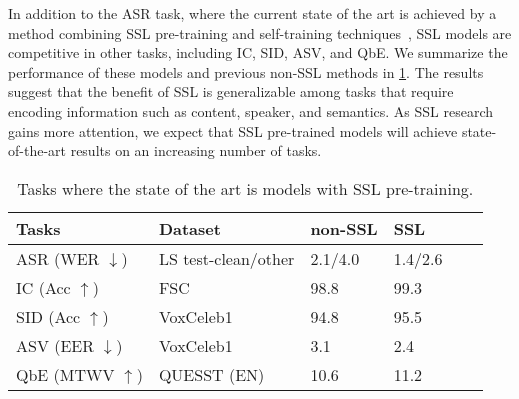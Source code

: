 In addition to the ASR task, where the current state of the art is achieved by a method
combining SSL pre-training and self-training 
techniques~\parencite{zhang_pushing_2020}, SSL models are competitive in other tasks, including IC,
SID, ASV, and QbE. We summarize the performance of these models and previous
non-SSL methods in \cref{table:sota_performance}. The results suggest that the
benefit of SSL is generalizable among tasks that require encoding 
information such as content, speaker, and semantics. As SSL research
gains more attention, we expect that SSL pre-trained models will 
achieve state-of-the-art results on an increasing number of tasks.

\begin{table}[t]
  \centering
  \footnotesize
  \caption{Tasks where the state of the art is models with SSL pre-training.}
  \label{table:sota_performance}
  \renewcommand*\arraystretch{1.2}
  \begin{tabular}{llllll}  
    \toprule
    Tasks & Dataset & non-SSL & SSL \\
    \midrule
    ASR (WER $\downarrow$) & LS test-clean/other & 2.1/4.0 \parencite{xu_iterative_2020} & 1.4/2.6 \parencite{zhang_pushing_2020} \\ \hline
    IC (Acc $\uparrow$) & FSC & 98.8 \parencite{lugosch_speech_2019} & 99.3\parencite{chen_unispeechsat_2021} \\ \hline
    SID (Acc $\uparrow$) & VoxCeleb1 & 94.8 \parencite{hajibabaei_unified_2018} & 95.5 \parencite{chen_wavlm_2021} \\ \hline
    ASV (EER $\downarrow$) & VoxCeleb1 & 3.1 \parencite{hajavi_siamese_2021} & 2.4 \parencite{wang_finetuned_2021} \\ \hline
    QbE (MTWV $\uparrow$) & QUESST (EN) & 10.6 \parencite{rodriguez-fuentes_gttsehu_2014} & 11.2\parencite{chen_unispeechsat_2021} \\
    \bottomrule
  \end{tabular}
\end{table}

